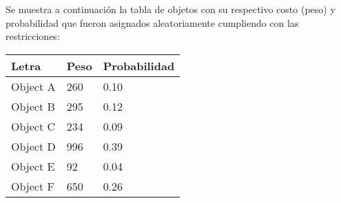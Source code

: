 \documentclass[10pt,letterpaper]{article}
\begin{document}
Se muestra a continuación la tabla de objetos con su respectivo costo (peso) y probabilidad 
        que fueron asignados aleatoriamente cumpliendo con las restricciones: 
\begin{center}
\begin{tabu} to 0.6\textwidth { | X[l] | X[l] | X[l] | } 
\hline
{}
\textbf{Letra} & \textbf{Peso} & \textbf{Probabilidad}\\
\hline
Object A & 260 & 0.10 \\
\hline
Object B & 295 & 0.12 \\
\hline
Object C & 234 & 0.09 \\
\hline
Object D & 996 & 0.39 \\
\hline
Object E & 92 & 0.04 \\
\hline
Object F & 650 & 0.26 \\
\hline
\end{tabu} \\
\end{center}
\end{document}
